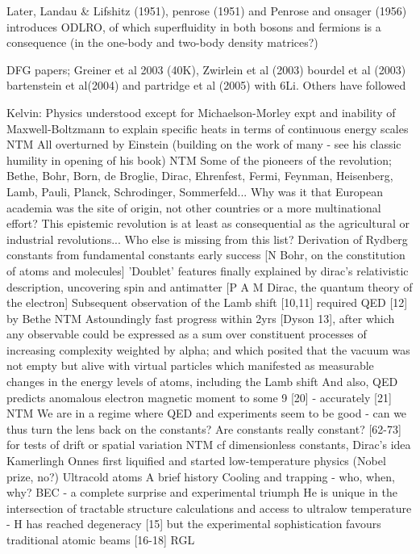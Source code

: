 
Later, Landau \& Lifshitz (1951), penrose (1951) and Penrose and onsager (1956) introduces ODLRO, of which superfluidity in both bosons and fermions is a consequence (in the one-body and two-body density matrices?)

DFG papers; Greiner et al 2003 (40K), Zwirlein et al (2003) bourdel et al (2003) bartenstein et al(2004) and partridge et al (2005) with 6Li. Others have followed


Kelvin: Physics understood except for Michaelson-Morley expt and inability of Maxwell-Boltzmann to explain specific heats in terms of continuous energy scales NTM
			All overturned by Einstein (building on the work of many - see his classic humility in opening of his book) NTM
			Some of the pioneers of the revolution; Bethe, Bohr, Born, de Broglie, Dirac, Ehrenfest, Fermi, Feynman, Heisenberg, Lamb, Pauli, Planck, Schrodinger, Sommerfeld...
				Why was it that European academia was the site of origin, not other countries or a more multinational effort? This epistemic revolution is at least as consequential as the agricultural or industrial revolutions...
				Who else is missing from this list?
			Derivation of Rydberg constants from fundamental constants early success [N Bohr, on the constitution of atoms and molecules] 
			'Doublet' features finally explained by dirac's relativistic description, uncovering spin and antimatter [P A M Dirac, the quantum theory of the electron]
			Subsequent observation of the Lamb shift [10,11] required QED [12] by Bethe  NTM
			Astoundingly fast progress within 2yrs [Dyson 13], after which any observable could be expressed as a sum over constituent processes of increasing complexity weighted by alpha; and which posited that the vacuum was not empty but alive with virtual particles which manifested as measurable changes in the energy levels of atoms, including the Lamb shift
			And also, QED predicts anomalous electron magnetic moment to some 9 [20] - accurately [21] NTM
			We are in a regime where QED and experiments seem to be good - can we thus turn the lens back on the constants?	
			Are constants really constant? [62-73] for tests of drift or spatial variation  NTM
				cf dimensionless constants, Dirac's idea
Kamerlingh Onnes first liquified and started low-temperature physics (Nobel prize, no?)
Ultracold atoms A brief history Cooling and trapping - who, when, why?
BEC - a complete surprise and experimental triumph
He is unique in the intersection of tractable structure calculations and access to ultralow temperature - H has reached degeneracy [15] but the experimental sophistication favours traditional atomic beams [16-18] RGL


